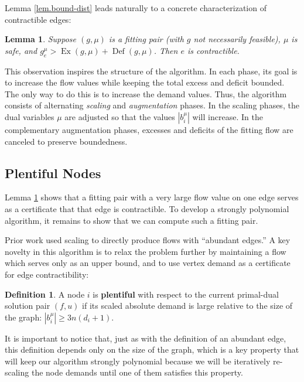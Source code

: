 \documentclass[11pt]{article}
\newtheorem{lemma}[theorem]{Lemma}
\theoremstyle{definition}
\newtheorem{definition}{Definition}[section]
\theoremstyle{definition}
\newcommand{\biu}{b_{i}^{\mu}}
\DeclareMathOperator{\Ex}{Ex}
\DeclareMathOperator{\Def}{Def}
\begin{document}
    Lemma \ref{lem.bound-dist} leads naturally to a concrete characterization of contractible edges:
    \begin{lemma} \label{lem.contractibility}
    Suppose $(g, \mu)$ is a fitting pair (with $g$ not necessarily feasible),
    $\mu$ is safe, and $g^\mu_e > \Ex(g, \mu) + \Def(g, \mu)$.
    Then $e$ is contractible.
    \end{lemma}
    
    This observation inspires the structure of the algorithm. In each phase, its
    goal is to increase the flow values while keeping the total excess and deficit
    bounded. The only way to do this is to increase the demand values. Thus, the algorithm
    consists of alternating \emph{scaling} and \emph{augmentation} phases. In the scaling phases, the
    dual variables $\mu$ are adjusted so that the values $|\biu|$ will increase. In the
    complementary augmentation phases, excesses and deficits of the fitting flow are
    canceled to preserve boundedness.

	\subsection{Plentiful Nodes}
    Lemma \ref{lem.contractibility} shows that a fitting pair with a very
    large flow value on one edge serves as a certificate that that edge is contractible.
    To develop a strongly polynomial algorithm, it remains to show that we can compute
    such a fitting pair.

    Prior work used scaling to directly produce flows with ``abundant edges.''
    A key novelty in this algorithm is to relax the problem further by maintaining
    a flow which serves only as an upper bound, and to use vertex demand as a certificate
    for edge contractibility:
    \begin{definition}
    A node $i$ is \textbf{plentiful} with respect
    to the current primal-dual solution pair $(f,u)$ if its scaled absolute
    demand is large relative to the size of the graph: $|b_i^{\mu}| \ge 3n(d_i + 1)$.
    \end{definition}

    It is important to notice that, just as with the definition of an abundant  edge,
    this definition depends only on the size of the graph, which is a key property
    that will keep our algorithm strongly polynomial because we will be iteratively
    re-scaling the node demands until one of them satisfies this property.
\end{document}
